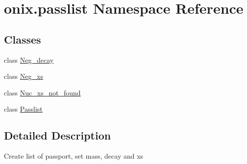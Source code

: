 \hypertarget{namespaceonix_1_1passlist}{}\section{onix.\+passlist Namespace Reference}
\label{namespaceonix_1_1passlist}
\subsection*{Classes}
\begin{DoxyCompactItemize}
\item 
class \hyperlink{classonix_1_1passlist_1_1Neg__decay}{Neg\+\_\+decay}
\item 
class \hyperlink{classonix_1_1passlist_1_1Neg__xs}{Neg\+\_\+xs}
\item 
class \hyperlink{classonix_1_1passlist_1_1Nuc__xs__not__found}{Nuc\+\_\+xs\+\_\+not\+\_\+found}
\item 
class \hyperlink{classonix_1_1passlist_1_1Passlist}{Passlist}
\end{DoxyCompactItemize}


\subsection{Detailed Description}
\begin{DoxyVerb}Create list of passport, set mass, decay and xs\end{DoxyVerb}
 